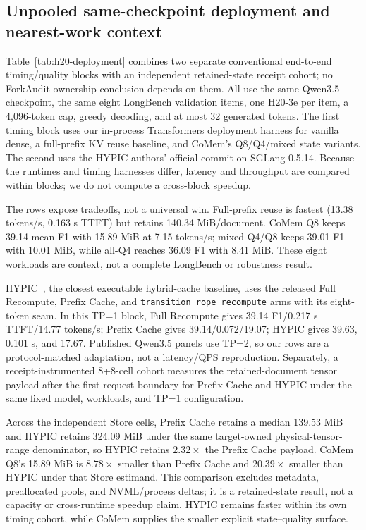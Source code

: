 \documentclass{article}
\begin{document}


\subsection{Unpooled same-checkpoint deployment and nearest-work context}

Table~\ref{tab:h20-deployment} combines two separate conventional end-to-end
timing/quality blocks with an independent retained-state receipt cohort; no
ForkAudit ownership conclusion depends on them.  All use the same Qwen3.5
checkpoint, the same eight LongBench validation items, one H20-3e per item, a
4,096-token cap, greedy decoding, and at most 32 generated tokens.  The first
timing block uses our in-process Transformers deployment harness for vanilla
dense, a full-prefix KV reuse baseline, and CoMem's Q8/Q4/mixed state variants.
The second uses the HYPIC authors' official commit on SGLang 0.5.14.  Because
the runtimes and timing harnesses differ, latency and throughput are compared
within blocks; we do not compute a cross-block speedup.

The rows expose tradeoffs, not a universal win.  Full-prefix reuse is fastest
(13.38 tokens/s, 0.163 s TTFT) but retains 140.34 MiB/document.  CoMem Q8 keeps
39.14 mean F1 with 15.89 MiB at 7.15 tokens/s; mixed Q4/Q8 keeps 39.01 F1 with
10.01 MiB, while all-Q4 reaches 36.09 F1 with 8.41 MiB.  These eight workloads
are context, not a complete LongBench or robustness result.

HYPIC~\citep{liu2026hypic}, the closest executable hybrid-cache baseline, uses
the released Full Recompute, Prefix Cache, and
\texttt{transition\_rope\_recompute} arms with its eight-token seam.  In this
TP=1 block, Full Recompute gives 39.14 F1/0.217 s TTFT/14.77 tokens/s; Prefix
Cache gives 39.14/0.072/19.07; HYPIC gives 39.63, 0.101 s, and 17.67.
Published Qwen3.5 panels use TP=2, so our rows are a protocol-matched
adaptation, not a latency/QPS reproduction.  Separately, a receipt-instrumented
8+8-cell cohort measures the retained-document tensor payload after the first
request boundary for Prefix Cache and HYPIC under the same fixed model,
workloads, and TP=1 configuration.



Across the independent Store cells, Prefix Cache retains a median 139.53 MiB
and HYPIC retains 324.09 MiB under the same target-owned physical-tensor-range
denominator, so HYPIC retains $2.32\times$ the Prefix Cache payload.  CoMem Q8's
15.89 MiB is $8.78\times$ smaller than Prefix Cache and $20.39\times$ smaller
than HYPIC under that Store estimand.  This comparison excludes metadata,
preallocated pools, and NVML/process deltas; it is a retained-state result, not
a capacity or cross-runtime speedup claim.  HYPIC remains faster within its own
timing cohort, while CoMem supplies the smaller explicit state--quality surface.
\end{document}
